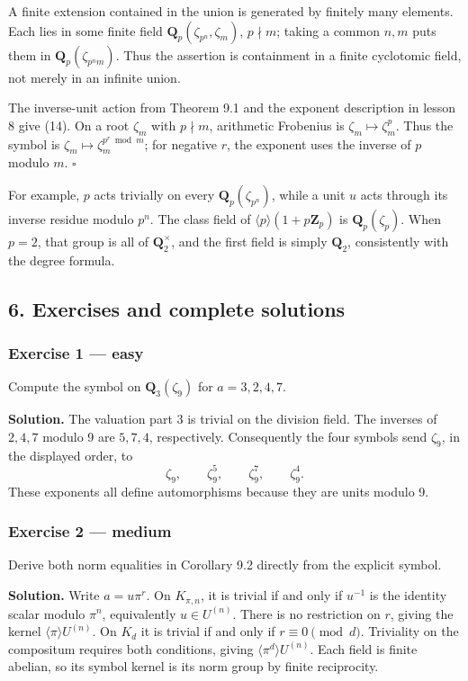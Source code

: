 \documentclass[11pt,a4paper]{article}
\begin{document}
A finite extension contained in the union is generated by finitely many
elements. Each lies in some finite field
\(\mathbf Q_p(\zeta_{p^n},\zeta_m)\), \(p\nmid m\); taking a common
\(n,m\) puts them in \(\mathbf Q_p(\zeta_{p^nm})\). Thus the assertion
is containment in a finite cyclotomic field, not merely in an infinite
union.

The inverse-unit action from Theorem 9.1 and the exponent description in
lesson 8 give (14). On a root \(\zeta_m\) with \(p\nmid m\), arithmetic
Frobenius is \(\zeta_m\mapsto\zeta_m^p\). Thus the symbol is
\(\zeta_m\mapsto\zeta_m^{p^r\bmod m}\); for negative \(r\), the exponent
uses the inverse of \(p\) modulo \(m\). \(\square\)

For example, \(p\) acts trivially on every \(\mathbf Q_p(\zeta_{p^n})\),
while a unit \(u\) acts through its inverse residue modulo \(p^n\). The
class field of \(\langle p\rangle(1+p\mathbf Z_p)\) is
\(\mathbf Q_p(\zeta_p)\). When \(p=2\), that group is all of
\(\mathbf Q_2^\times\), and the first field is simply \(\mathbf Q_2\),
consistently with the degree formula.

\subsection{6. Exercises and complete
solutions}\label{exercises-and-complete-solutions}

\subsubsection{Exercise 1 --- easy}\label{exercise-1-easy}

Compute the symbol on \(\mathbf Q_3(\zeta_9)\) for \(a=3,2,4,7\).

\textbf{Solution.} The valuation part \(3\) is trivial on the division
field. The inverses of \(2,4,7\) modulo 9 are \(5,7,4\), respectively.
Consequently the four symbols send \(\zeta_9\), in the displayed order,
to \[
\zeta_9,\qquad\zeta_9^5,\qquad\zeta_9^7,\qquad\zeta_9^4.
\] These exponents all define automorphisms because they are units
modulo 9.

\subsubsection{Exercise 2 --- medium}\label{exercise-2-medium}

Derive both norm equalities in Corollary 9.2 directly from the explicit
symbol.

\textbf{Solution.} Write \(a=u\pi^r\). On \(K_{\pi,n}\), it is trivial
if and only if \(u^{-1}\) is the identity scalar modulo \(\pi^n\),
equivalently \(u\in U^{(n)}\). There is no restriction on \(r\), giving
the kernel \(\langle\pi\rangle U^{(n)}\). On \(K_d\) it is trivial if
and only if \(r\equiv0\pmod d\). Triviality on the compositum requires
both conditions, giving \(\langle\pi^d\rangle U^{(n)}\). Each field is
finite abelian, so its symbol kernel is its norm group by finite
reciprocity.
\end{document}
